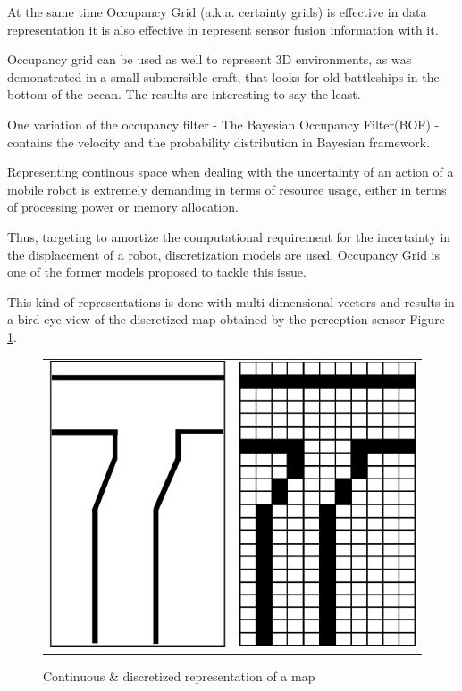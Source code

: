 At the same time Occupancy Grid (a.k.a. certainty grids) is effective in data representation it is also effective in represent sensor fusion information with it. 

Occupancy grid can be used as well to represent 3D environments, as was demonstrated in a small submersible craft, that looks for old battleships in the bottom of the ocean\cite{DBLP:journals/aim/Moravec88}. The results are interesting to say the least.

One variation of the occupancy filter - The Bayesian Occupancy Filter(BOF) - contains the velocity and the probability distribution in Bayesian framework.

Representing continous space when dealing with the uncertainty of an action of a mobile robot is extremely demanding in terms of resource usage, either in terms of processing power or memory allocation.

Thus, targeting to amortize the computational requirement for the incertainty in the displacement of a robot, discretization models are used, Occupancy Grid\cite{Elfes:1989:UOG:68491.68495} is one of the former models proposed to tackle this issue.

This kind of representations is done with multi-dimensional vectors and results in a bird-eye view of the discretized map obtained by the perception sensor Figure \ref{fig:grid:continuous:discretized}.

\begin{figure}[h]
\centering
	\begin{tabular}{lr}\\
		\includegraphics[width=0.25\columnwidth]{img/fig:grid:continuous} &
		\includegraphics[width=0.25\columnwidth]{img/fig:grid:discretized}
	\end{tabular}
	\caption{Continuous \& discretized representation of a map}
	\label{fig:grid:continuous:discretized}
\end{figure}

